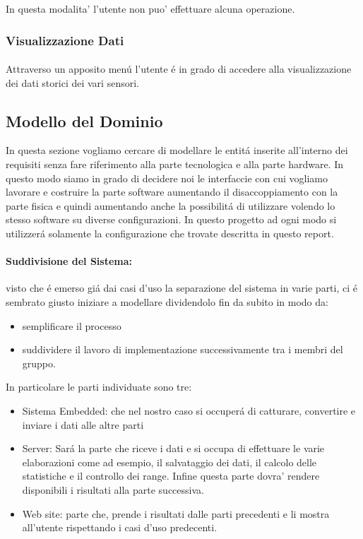 In questa modalita' l'utente non puo' effettuare alcuna operazione.

\subsubsection{Visualizzazione Dati}

\paragraph{} Attraverso un apposito men\'u l'utente \'e in grado di accedere alla visualizzazione dei dati storici dei vari sensori.

\subsection{Modello del Dominio}

In questa sezione vogliamo cercare di modellare le entit\'a inserite all'interno dei requisiti senza fare riferimento alla parte tecnologica e alla parte hardware. In questo modo siamo in grado di decidere noi le interfaccie con cui vogliamo lavorare e costruire la parte software aumentando il disaccoppiamento con la parte fisica e quindi aumentando anche la possibilit\'a di utilizzare volendo lo stesso software su diverse configurazioni. In questo progetto ad ogni modo si utilizzer\'a solamente la configurazione che trovate descritta in questo report.

\paragraph{Suddivisione del Sistema:} visto che \'e emerso gi\'a dai casi d'uso la separazione del sistema in varie parti, ci \'e sembrato giusto iniziare a modellare dividendolo fin da subito in modo da:
\begin{itemize}
  \item semplificare il processo
  \item suddividere il lavoro di implementazione successivamente tra i membri del gruppo.
\end{itemize}

In particolare le parti individuate sono tre:

\begin{itemize}
  \item Sistema Embedded: che nel nostro caso si occuper\'a di catturare, convertire e inviare i dati alle altre parti
  \item Server: Sar\'a la parte che riceve i dati e si occupa di effettuare le varie elaborazioni come ad esempio, il salvataggio dei dati, il calcolo delle statistiche e il controllo dei range. Infine questa parte dovra' rendere disponibili i risultati alla parte successiva.
  \item Web site: parte che, prende i risultati dalle parti precedenti e li mostra all'utente rispettando i casi d'uso predecenti.
\end{itemize}

